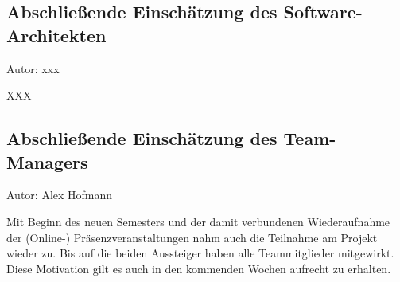 \subsection{Abschließende Einschätzung des Software-Architekten}
{\small Autor: xxx}

XXX

\subsection{Abschließende Einschätzung des Team-Managers}
{\small Autor: Alex Hofmann}

Mit Beginn des neuen Semesters und der damit verbundenen Wiederaufnahme der (Online-) Präsenzveranstaltungen nahm auch die Teilnahme am Projekt wieder zu. Bis auf die beiden Aussteiger haben alle Teammitglieder mitgewirkt. Diese Motivation gilt es auch in den kommenden Wochen aufrecht zu erhalten.
